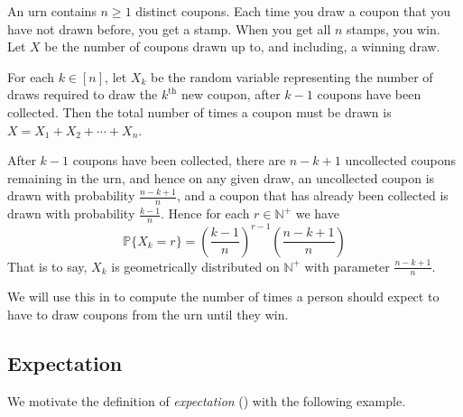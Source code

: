 \begin{example}
\label{exCoinCollectorSetUp}
An urn contains $n \ge 1$ distinct coupons. Each time you draw a coupon that you have not drawn before, you get a stamp. When you get all $n$ stamps, you win. Let $X$ be the number of coupons drawn up to, and including, a winning draw.

For each $k \in [n]$, let $X_k$ be the random variable representing the number of draws required to draw the $k^{\text{th}}$ new coupon, after $k-1$ coupons have been collected. Then the total number of times a coupon must be drawn is $X = X_1+X_2+\cdots+X_n$.

After $k-1$ coupons have been collected, there are $n-k+1$ uncollected coupons remaining in the urn, and hence on any given draw, an uncollected coupon is drawn with probability $\frac{n-k+1}{n}$, and a coupon that has already been collected is drawn with probability $\frac{k-1}{n}$. Hence for each $r \in \mathbb{N}^+$ we have
\[ \mathbb{P} \{ X_k=r \} = \left( \frac{k-1}{n} \right)^{r-1} \left( \frac{n-k+1}{n} \right) \]
That is to say, $X_k$ is geometrically distributed on $\mathbb{N}^+$ with parameter $\frac{n-k+1}{n}$.

We will use this in  to compute the number of times a person should expect to have to draw coupons from the urn until they win.
\end{example}

\subsection*{Expectation}

We motivate the definition of \textit{expectation} () with the following example.

